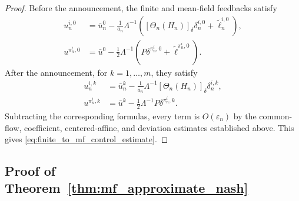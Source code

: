 \documentclass[12pt]{article}
\numberwithin{equation}{section}
\theoremstyle{definition}
\begin{document}
\begin{proof}
Before the announcement, the finite and mean-field feedbacks satisfy
\[
\begin{aligned}
u_n^{i,0}
&=\bar u_n^0
-\frac1{a_n}\Lambda^{-1}
\left(
[\Theta_n(H_n)]_\delta\delta_n^{i,0}
+\widetilde\ell_n^{i,0}
\right),
\\
u^{\pi_n^i,0}
&=\bar u^0
-\frac12\Lambda^{-1}
\left(
P\delta^{\pi_n^i,0}
+\widetilde\ell^{\pi_n^i,0}
\right).
\end{aligned}
\]
After the announcement, for \(k=1,\ldots,m\), they satisfy
\[
\begin{aligned}
u_n^{i,k}
&=\bar u_n^k
-\frac1{a_n}\Lambda^{-1}
[\Theta_n(H_n)]_\delta\delta_n^{i,k},
\\
u^{\pi_n^i,k}
&=\bar u^k
-\frac12\Lambda^{-1}P\delta^{\pi_n^i,k}.
\end{aligned}
\]
Subtracting the corresponding formulas, every term is
\(O(\varepsilon_n)\) by the common-flow, coefficient, centered-affine, and
deviation estimates established above. This gives
\eqref{eq:finite_to_mf_control_estimate}.
\end{proof}

\subsection{Proof of Theorem~\ref{thm:mf_approximate_nash}}
\label{subsec:proof_mf_approximate_nash}
\end{document}
